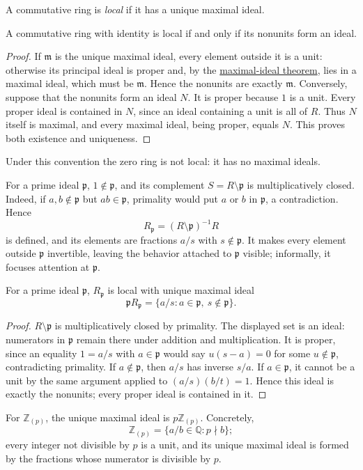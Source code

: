 \begin{definition}
A commutative ring is \emph{local} if it has a unique maximal ideal.
\end{definition}
\begin{proposition}
A commutative ring with identity is local if and only if its nonunits form an
ideal.
\end{proposition}
\begin{proof}
If \(\mathfrak m\) is the unique maximal ideal, every element outside it is a
unit: otherwise its principal ideal is proper and, by the
\hyperref[thm:maximal-ideal-existence]{maximal-ideal theorem}, lies in a
maximal ideal, which must be \(\mathfrak m\). Hence the nonunits are exactly
\(\mathfrak m\). Conversely, suppose that the nonunits form an ideal \(N\).
It is proper because \(1\) is a unit. Every proper ideal is contained in
\(N\), since an ideal containing a unit is all of \(R\). Thus \(N\) itself
is maximal, and every maximal ideal, being proper, equals \(N\). This proves
both existence and uniqueness.
\end{proof}
\begin{unremark}
Under this convention the zero ring is not local: it has no maximal ideals.
\end{unremark}

For a prime ideal \(\mathfrak p\), \(1\notin\mathfrak p\), and its complement
\(S=R\setminus\mathfrak p\) is multiplicatively closed.  Indeed, if
\(a,b\notin\mathfrak p\) but \(ab\in\mathfrak p\), primality would put
\(a\) or \(b\) in \(\mathfrak p\), a contradiction.  Hence
\[R_{\mathfrak p}=(R\setminus\mathfrak p)^{-1}R\]
is defined, and its elements are fractions \(a/s\) with \(s\notin\mathfrak p\).
It makes every element outside \(\mathfrak p\) invertible, leaving the
behavior attached to \(\mathfrak p\) visible; informally, it focuses attention
at \(\mathfrak p\).
\begin{theorem}
For a prime ideal \(\mathfrak p\), \(R_{\mathfrak p}\) is local with unique
maximal ideal
\[\mathfrak pR_{\mathfrak p}=\{a/s:a\in\mathfrak p,\ s\notin\mathfrak p\}.\]
\end{theorem}
\begin{proof}
\(R\setminus\mathfrak p\) is multiplicatively closed by primality. The
displayed set is an ideal: numerators in \(\mathfrak p\) remain there under
addition and multiplication. It is proper, since an equality \(1=a/s\)
with \(a\in\mathfrak p\) would say \(u(s-a)=0\) for some
\(u\notin\mathfrak p\), contradicting primality. If \(a\notin\mathfrak p\),
then \(a/s\) has inverse \(s/a\). If \(a\in\mathfrak p\), it cannot be a
unit by the same argument applied to \((a/s)(b/t)=1\). Hence this ideal is
exactly the nonunits; every proper ideal is contained in it.
\end{proof}
For \(\mathbb Z_{(p)}\), the unique maximal ideal is
\(p\mathbb Z_{(p)}\).  Concretely,
\[\mathbb Z_{(p)}=\{a/b\in\mathbb Q:p\nmid b\};\]
every integer not divisible by \(p\) is a unit, and its unique maximal ideal
is formed by the fractions whose numerator is divisible by \(p\).

